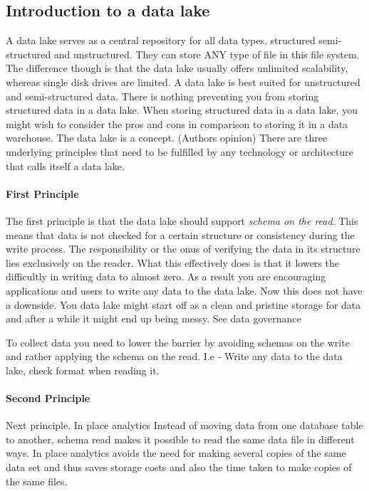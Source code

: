 

\subsection{Introduction to a data lake}
A data lake serves as a central repository for all data types, structured semi-structured and unstructured.
They can store ANY type of file in this file system.
The difference though is that the data lake usually offers unlimited scalability, whereas single disk drives are limited.
A data lake is best suited for unstructured and semi-structured data.
There is nothing preventing you from storing structured data in a data lake.
When storing structured data in a data lake, you might wish to consider the pros and cons in comparison to storing it in a data warehouse.
The data lake is a concept.
(Authors opinion) There are three underlying principles that need to be fulfilled by any technology or architecture that calls itself a data lake.

\paragraph{First Principle}
The first principle is that the data lake should support \textit{schema on the read}.
This means that data is not checked for a certain structure or consistency during the write process.
The responsibility or the onus of verifying the data in its structure lies exclusively on the reader.
What this effectively does is that it lowers the difficultly in writing data to almost zero.
As a result you are encouraging applications and users to write any data to the data lake. %
Now this does not have a downside.
You data lake might start off as a clean and pristine storage for data and after a while it might end up being messy.
See data governance

\begin{note}
    To collect data you need to lower the barrier by avoiding schemas on the write and rather applying the schema on the read.
    I.e - Write any data to the data lake, check format when reading it.
\end{note}

\paragraph{Second Principle}
Next principle.
In place analytics
Instead of moving data from one database table to another, schema read makes it possible to read the same data file in different ways.
In place analytics avoids the need for making several copies of the same data set and thus saves storage costs and also the time taken to make copies of the same files.

